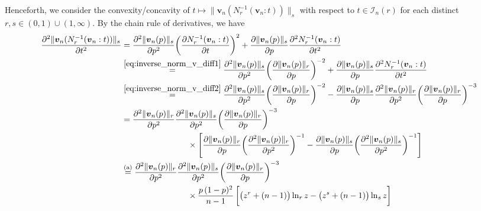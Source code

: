 \documentclass[conference, draftcls, onecolumn]{IEEEtran}
\theoremstyle{plain}
\newcommand{\bvec}[1]{\boldsymbol{#1}}
\newcommand{\lemref}[1]{Lemma~\ref{#1}}
\begin{document}
\begin{IEEEproof}[Proof of \lemref{lem:convex_v}]
Henceforth, we consider the convexity/concavity of $t \mapsto \| \bvec{v}_{n}( N_{r}^{-1}( \bvec{v}_{n} : t ) ) \|_{s}$ with respect to $t \in \mathcal{I}_{n}( r )$ for each distinct $r, s \in (0, 1) \cup (1, \infty)$.
By the chain rule of derivatives, we have
\begin{align}
\frac{ \partial^{2} \| \bvec{v}_{n}( N_{r}^{-1}( \bvec{v}_{n} : t ) ) \|_{s} }{ \partial t^{2} }
& =
\frac{ \partial^{2} \| \bvec{v}_{n}( p ) \|_{s} }{ \partial p^{2} } \bigg( \frac{ \partial N_{r}^{-1}( \bvec{v}_{n} : t ) }{ \partial t } \bigg)^{2} + \frac{ \partial \| \bvec{v}_{n}( p ) \|_{s} }{ \partial p } \frac{ \partial^{2} N_{r}^{-1}( \bvec{v}_{n} : t ) }{ \partial t^{2} }
\\
& \overset{\eqref{eq:inverse_norm_v_diff1}}{=}
\frac{ \partial^{2} \| \bvec{v}_{n}( p ) \|_{s} }{ \partial p^{2} } \bigg( \frac{ \partial \| \bvec{v}_{n}( p ) \|_{r} }{ \partial p } \bigg)^{-2} + \frac{ \partial \| \bvec{v}_{n}( p ) \|_{s} }{ \partial p } \frac{ \partial^{2} N_{r}^{-1}( \bvec{v}_{n} : t ) }{ \partial t^{2} }
\\
& \overset{\eqref{eq:inverse_norm_v_diff2}}{=}
\frac{ \partial^{2} \| \bvec{v}_{n}( p ) \|_{s} }{ \partial p^{2} } \bigg( \frac{ \partial \| \bvec{v}_{n}( p ) \|_{r} }{ \partial p } \bigg)^{-2} - \frac{ \partial \| \bvec{v}_{n}( p ) \|_{s} }{ \partial p } \frac{ \partial^{2} \| \bvec{v}_{n}( p ) \|_{r} }{ \partial p^{2} } \bigg( \frac{ \partial \| \bvec{v}_{n}( p ) \|_{r} }{ \partial p } \bigg)^{-3}
\\
& =
\frac{ \partial^{2} \| \bvec{v}_{n}( p ) \|_{r} }{ \partial p^{2} } \frac{ \partial^{2} \| \bvec{v}_{n}( p ) \|_{s} }{ \partial p^{2} } \bigg( \frac{ \partial \| \bvec{v}_{n}( p ) \|_{r} }{ \partial p } \bigg)^{-3}
\notag \\
& \qquad \qquad \qquad \qquad \times
\Bigg[ \frac{ \partial \| \bvec{v}_{n}( p ) \|_{r} }{ \partial p } \bigg( \frac{ \partial^{2} \| \bvec{v}_{n}( p ) \|_{r} }{ \partial p^{2} } \bigg)^{-1} - \frac{ \partial \| \bvec{v}_{n}( p ) \|_{s} }{ \partial p } \bigg( \frac{ \partial^{2} \| \bvec{v}_{n}( p ) \|_{s} }{ \partial p^{2} } \bigg)^{-1} \Bigg]
\\
& \overset{\text{(a)}}{=}
\frac{ \partial^{2} \| \bvec{v}_{n}( p ) \|_{r} }{ \partial p^{2} } \frac{ \partial^{2} \| \bvec{v}_{n}( p ) \|_{s} }{ \partial p^{2} } \bigg( \frac{ \partial \| \bvec{v}_{n}( p ) \|_{r} }{ \partial p } \bigg)^{-3}
\notag \\
& \qquad \qquad \qquad \qquad \times
\frac{ p \, (1-p)^{2} }{ n-1 } \, \bigg[ \big( z^{r} + (n-1) \big) \ln_{r} z - \big( z^{s} + (n-1) \big) \ln_{s} z \bigg]

\end{align}
\end{IEEEproof}
\end{document}
